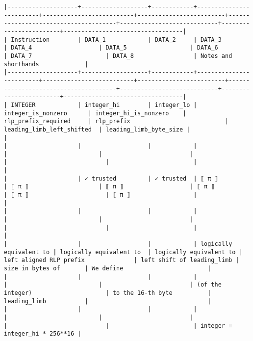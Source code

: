 \documentclass[varwidth=\maxdimen,margin=0.5cm,multi={verbatim}]{standalone}
\begin{document}
\begin{verbatim}
|--------------------+-------------------+------------+-------------------------+--------------------------+-------------------------+--------------------------------------+----------------------------+------------------------+----------------------------------|
| Instruction        | DATA_1            | DATA_2     | DATA_3                  | DATA_4                   | DATA_5                  | DATA_6                               | DATA_7                     | DATA_8                 | Notes and shorthands             |
|--------------------+-------------------+------------+-------------------------+--------------------------+-------------------------+--------------------------------------+----------------------------+------------------------+----------------------------------|
| INTEGER            | integer_hi        | integer_lo | integer_is_nonzero      | integer_hi_is_nonzero    | rlp_prefix_required     | rlp_prefix                           | leading_limb_left_shifted  | leading_limb_byte_size |                                  |
|                    |                   |            |                         |                          |                         |                                      |                            |                        |                                  |
|                    | ✓ trusted         | ✓ trusted  | ⟦ π ⟧                   | ⟦ π ⟧                    | ⟦ π ⟧                   | ⟦ π ⟧                                | ⟦ π ⟧                      | ⟦ π ⟧                  |                                  |
|                    |                   |            |                         |                          |                         |                                      |                            |                        |                                  |
|                    |                   |            | logically equivalent to | logically equivalent to  | logically equivalent to | left aligned RLP prefix              | left shift of leading_limb | size in bytes of       | We define                        |
|                    |                   |            |                         |                          |                         | (of the integer)                     | to the 16-th byte          | leading_limb           |                                  |
|                    |                   |            |                         |                          |                         |                                      |                            |                        | integer ≡   integer_hi * 256**16 |

\end{verbatim}
\end{document}
